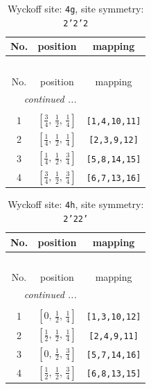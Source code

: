 \documentclass[fleqn,8pt]{jsarticle}
\begin{document}
\renewcommand{\arraystretch}{1.2}
\begin{longtable}{ccc}
\caption{Wyckoff site: {\tt 4g}, site symmetry: {\tt 2'2'2}}
 \\
 \hline \hline
No. & position & mapping \\ \hline \endfirsthead

\multicolumn{2}{l}{\tablename\ \thetable{}} \\
 \hline \hline
No. & position & mapping \\ \hline \endhead

 \hline \hline
\multicolumn{2}{r}{\footnotesize\it continued ...} \\ \endfoot

 \hline \hline
\multicolumn{2}{r}{} \\ \endlastfoot

1 & $\left[ \frac{3}{4},\, \frac{1}{2},\, \frac{1}{4} \right]$ & {\tt [1,4,10,11]} \\ \hline
2 & $\left[ \frac{1}{4},\, \frac{1}{2},\, \frac{1}{4} \right]$ & {\tt [2,3,9,12]} \\ \hline
3 & $\left[ \frac{1}{4},\, \frac{1}{2},\, \frac{3}{4} \right]$ & {\tt [5,8,14,15]} \\ \hline
4 & $\left[ \frac{3}{4},\, \frac{1}{2},\, \frac{3}{4} \right]$ & {\tt [6,7,13,16]} \\
\end{longtable}
\renewcommand{\arraystretch}{1.2}
\begin{longtable}{ccc}
\caption{Wyckoff site: {\tt 4h}, site symmetry: {\tt 2'22'}}
 \\
 \hline \hline
No. & position & mapping \\ \hline \endfirsthead

\multicolumn{2}{l}{\tablename\ \thetable{}} \\
 \hline \hline
No. & position & mapping \\ \hline \endhead

 \hline \hline
\multicolumn{2}{r}{\footnotesize\it continued ...} \\ \endfoot

 \hline \hline
\multicolumn{2}{r}{} \\ \endlastfoot

1 & $\left[ 0,\, \frac{1}{2},\, \frac{1}{4} \right]$ & {\tt [1,3,10,12]} \\ \hline
2 & $\left[ \frac{1}{2},\, \frac{1}{2},\, \frac{1}{4} \right]$ & {\tt [2,4,9,11]} \\ \hline
3 & $\left[ 0,\, \frac{1}{2},\, \frac{3}{4} \right]$ & {\tt [5,7,14,16]} \\ \hline
4 & $\left[ \frac{1}{2},\, \frac{1}{2},\, \frac{3}{4} \right]$ & {\tt [6,8,13,15]} \\
\end{longtable}
\end{document}
